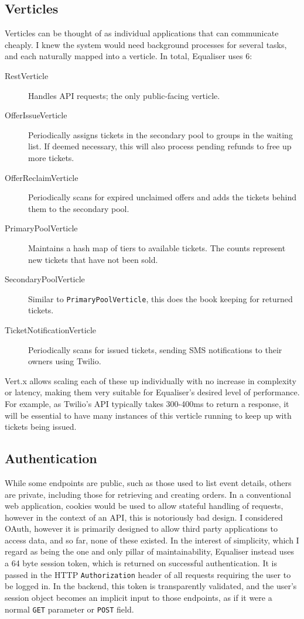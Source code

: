 \documentclass[12pt,a4paper]{bhamdissertation}
\newcommand{\code}[1]{\texttt{#1}}
\begin{document}
\subsection{Verticles}

Verticles can be thought of as individual applications that can communicate cheaply. I knew the system would need background processes for several tasks, and each naturally mapped into a verticle. In total, Equaliser uses 6:

\begin{description}
    \item[RestVerticle] Handles API requests; the only public-facing verticle. 
    \item[OfferIssueVerticle] Periodically assigns tickets in the secondary pool to groups in the waiting list. If deemed necessary, this will also process pending refunds to free up more tickets.
    \item[OfferReclaimVerticle] Periodically scans for expired unclaimed offers and adds the tickets behind them to the secondary pool.
    \item[PrimaryPoolVerticle] Maintains a hash map of tiers to available tickets. The counts represent new tickets that have not been sold.
    \item[SecondaryPoolVerticle] Similar to \code{PrimaryPoolVerticle}, this does the book keeping for returned tickets.
    \item[TicketNotificationVerticle] Periodically scans for issued tickets, sending SMS notifications to their owners using Twilio.
\end{description}

Vert.x allows scaling each of these up individually with no increase in complexity or latency, making them very suitable for Equaliser's desired level of performance. For example, as Twilio's API typically takes 300-400ms to return a response, it will be essential to have many instances of this verticle running to keep up with tickets being issued.

\subsection{Authentication} \label{tech_design_api_authentication}

While some endpoints are public, such as those used to list event details, others are private, including those for retrieving and creating orders. In a conventional web application, cookies would be used to allow stateful handling of requests, however in the context of an API, this is notoriously bad design. I considered OAuth, however it is primarily designed to allow third party applications to access data, and so far, none of these existed. In the interest of simplicity, which I regard as being the one and only pillar of maintainability, Equaliser instead uses a 64 byte session token, which is returned on successful authentication. It is passed in the HTTP \code{Authorization} header of all requests requiring the user to be logged in. In the backend, this token is transparently validated, and the user's session object becomes an implicit input to those endpoints, as if it were a normal \code{GET} parameter or \code{POST} field.
\end{document}
